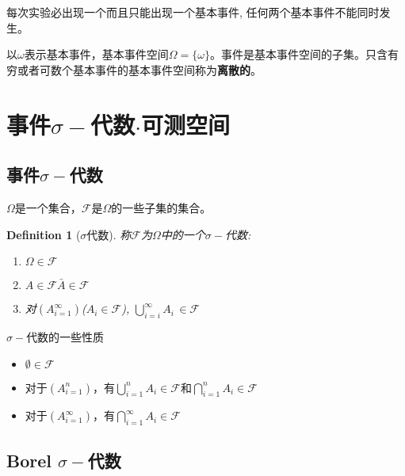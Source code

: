 \begin{basicevent}[基本事件]
每次实验必出现一个而且只能出现一个基本事件, 任何两个基本事件不能同时发生。
\end{basicevent}

\begin{basiceventspace}[基本事件空间]
以$\omega$表示基本事件，基本事件空间$\Omega = \{\omega\}$。事件是基本事件空间的子集。只含有穷或者可数个基本事件的基本事件空间称为{\bf 离散的}。
\end{basiceventspace}

\section{事件$\sigma-$代数$\cdot$可测空间}
\newtheorem{sigmaalgebra}{Definition}[section]
\newtheorem{smallestsigmaalgebraset}[sigmaalgebra]{Definition}

\subsection{事件$\sigma-$代数}

$\Omega$是一个集合，$\mathscr{F}$是$\Omega$的一些子集的集合。

\begin{sigmaalgebra}[$\sigma$代数]
    称$\mathscr{F}$为$\Omega$中的一个$\sigma-$代数:
    \begin{enumerate}
        \item $\Omega\in\mathscr{F}$
        \item $A\in\mathscr{F}$\equalwith${\bar A}\in\mathscr{F}$
        \item 对$(A_{i=1}^{\infty})$($A_i\in\mathscr{F}$), $\bigcup\limits_{i=i}^{\infty}A_i\,\in\mathscr{F}$
    \end{enumerate}
\end{sigmaalgebra}

\noindent$\sigma-$代数的一些性质
\begin{itemize}
    \item$\emptyset\in\mathscr{F}$
    \item 对于$(A_{i=1}^{n})$，有$\bigcup_{i=1}^nA_{i}\in\mathscr{F}$和$\bigcap_{i=1}^{n}A_i\in\mathscr{F}$
    \item 对于$(A_{i=1}^{\infty})$，有$\bigcap_{i=1}^{\infty}A_i\in\mathscr{F}$
\end{itemize}

\subsection{Borel $\sigma-$代数}

